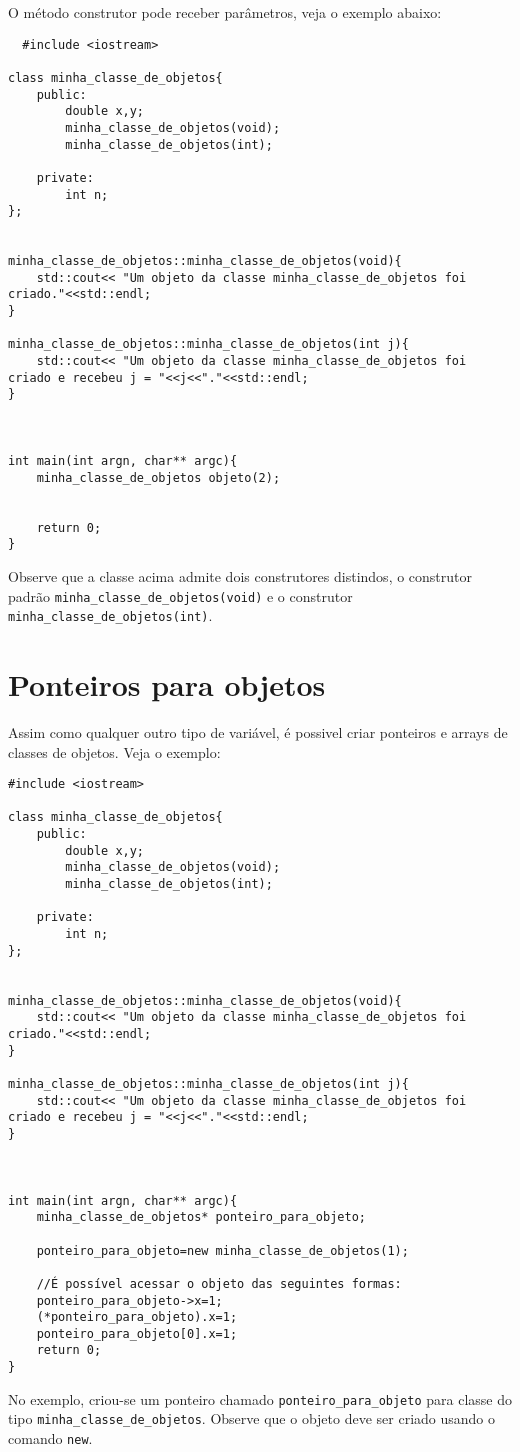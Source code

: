 O método construtor pode receber parâmetros, veja o exemplo abaixo:

\begin{verbatim}
  #include <iostream>

class minha_classe_de_objetos{
	public:
		double x,y;
		minha_classe_de_objetos(void);
		minha_classe_de_objetos(int);

	private:
		int n;		
};


minha_classe_de_objetos::minha_classe_de_objetos(void){
	std::cout<< "Um objeto da classe minha_classe_de_objetos foi criado."<<std::endl;
}

minha_classe_de_objetos::minha_classe_de_objetos(int j){
	std::cout<< "Um objeto da classe minha_classe_de_objetos foi criado e recebeu j = "<<j<<"."<<std::endl;
}



int main(int argn, char** argc){
	minha_classe_de_objetos objeto(2);


	return 0;
}
\end{verbatim}
Observe que a classe acima admite dois construtores distindos, o construtor padrão \verb+minha_classe_de_objetos(void)+ e o construtor \verb+minha_classe_de_objetos(int)+.


\section{Ponteiros para objetos}
Assim como qualquer outro tipo de variável, é possivel criar ponteiros e arrays de classes de objetos. Veja o exemplo:

\begin{verbatim}
#include <iostream>

class minha_classe_de_objetos{
	public:
		double x,y;
		minha_classe_de_objetos(void);
		minha_classe_de_objetos(int);

	private:
		int n;		
};


minha_classe_de_objetos::minha_classe_de_objetos(void){
	std::cout<< "Um objeto da classe minha_classe_de_objetos foi criado."<<std::endl;
}

minha_classe_de_objetos::minha_classe_de_objetos(int j){
	std::cout<< "Um objeto da classe minha_classe_de_objetos foi criado e recebeu j = "<<j<<"."<<std::endl;
}



int main(int argn, char** argc){
    minha_classe_de_objetos* ponteiro_para_objeto;

	ponteiro_para_objeto=new minha_classe_de_objetos(1);

	//É possível acessar o objeto das seguintes formas:
	ponteiro_para_objeto->x=1;
	(*ponteiro_para_objeto).x=1;	
	ponteiro_para_objeto[0].x=1;	
	return 0;
}
\end{verbatim}
No exemplo, criou-se um ponteiro chamado \verb+ponteiro_para_objeto+ para classe do tipo \verb+minha_classe_de_objetos+. Observe que o objeto deve ser criado usando o comando \verb+new+.
 